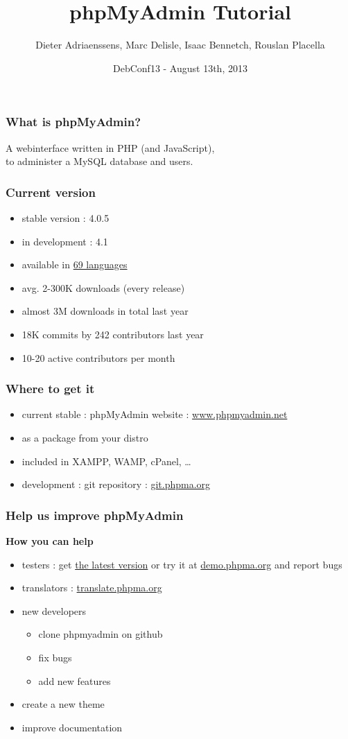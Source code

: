 \documentclass[14pt]{beamer}
\title{phpMyAdmin Tutorial}
\author[]{Dieter Adriaenssens, Marc Delisle, Isaac Bennetch, Rouslan Placella}
\institute[phpMyAdmin team]{phpMyAdmin team members}
\date[DebConf13 - 13Aug2013]{DebConf13 - August 13th, 2013}
\begin{document}
  \begin{frame}
  \titlepage
  \end{frame}
  \begin{frame}
    \frametitle{What is phpMyAdmin?}
      A webinterface written in PHP (and JavaScript),\\
      to administer a MySQL database and users.
  \end{frame}
  \begin{frame}
    \frametitle{Current version}
    \begin{itemize}
      \item stable version : 4.0.5
      \item in development : 4.1
      \item available in \href{http://www.phpmyadmin.net/home\_page/translations.php}{69 languages}
      \item avg. 2-300K downloads (every release)
      \item almost 3M downloads in total last year
      \item 18K commits by 242 contributors last year
      \item 10-20 active contributors per month
    \end{itemize}
  \end{frame}
  \begin{frame}
    \frametitle{Where to get it}
    \begin{itemize}
      \item current stable : phpMyAdmin website : \href{http://www.phpmyadmin.net/}{www.phpmyadmin.net}
      \item as a package from your distro
      \item included in XAMPP, WAMP, cPanel, \ldots
      \item development : git repository :  \href{http://git.phpma.org/}{git.phpma.org}
    \end{itemize}
  \end{frame}
  \begin{frame}
  \frametitle{Help us improve phpMyAdmin}
    \textbf{\color{PmaOlive}How you can help}
    \begin{itemize}
      \item testers : get \href{http://www.phpmyadmin.net/}{the latest version} or try it at \href{http://demo.phpma.org/}{demo.phpma.org} and report bugs
      \item translators : \href{http://translate.phpma.org/}{translate.phpma.org}
      \item new developers
        \begin{itemize}
          \item clone phpmyadmin on github
          \item fix bugs
          \item add new features
        \end{itemize}
      \item create a new theme
      \item improve documentation
    \end{itemize}
  \end{frame}
\end{document}
